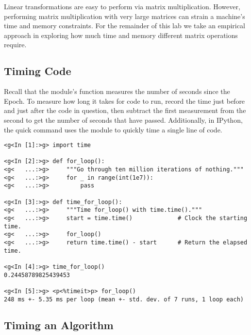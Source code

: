 Linear transformations are easy to perform via matrix multiplication.
However, performing matrix multiplication with very large matrices can strain a machine's time and memory constraints.
For the remainder of this lab we take an empirical approach in exploring how much time and memory different matrix operations require.

\subsection*{Timing Code} %

Recall that the  module's  function measures the number of seconds since the Epoch.
To measure how long it takes for code to run, record the time just before and just after the code in question, then subtract the first measurement from the second to get the number of seconds that have passed.
Additionally, in IPython, the quick command  uses the  module to quickly time a single line of code.

\begin{lstlisting}
<g<In [1]:>g> import time

<g<In [2]:>g> def for_loop():
<g<   ...:>g>     """Go through ten million iterations of nothing."""
<g<   ...:>g>     for _ in range(int(1e7)):
<g<   ...:>g>         pass

<g<In [3]:>g> def time_for_loop():
<g<   ...:>g>     """Time for_loop() with time.time()."""
<g<   ...:>g>     start = time.time()             # Clock the starting time.
<g<   ...:>g>     for_loop()
<g<   ...:>g>     return time.time() - start      # Return the elapsed time.

<g<In [4]:>g> time_for_loop()
0.24458789825439453

<g<In [5]:>g> <p<%timeit>p> for_loop()
248 ms +- 5.35 ms per loop (mean +- std. dev. of 7 runs, 1 loop each)
\end{lstlisting}

\subsection*{Timing an Algorithm} %


